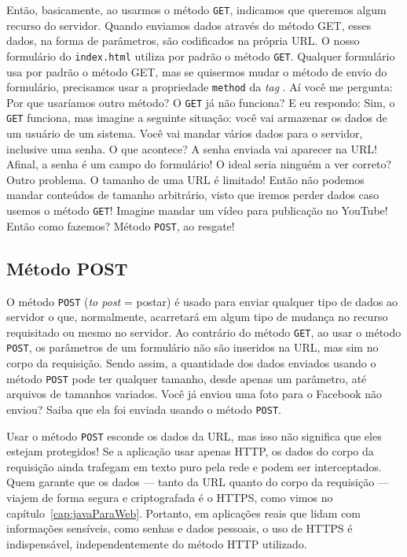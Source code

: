 Então, basicamente, ao usarmos o método \texttt{GET}, indicamos que queremos algum recurso do servidor. Quando enviamos dados através do método GET, esses dados, na forma de parâmetros, são codificados na própria URL. O nosso formulário do \texttt{index.html} utiliza por padrão o método \texttt{GET}. Qualquer formulário usa por padrão o método GET, mas se quisermos mudar o método de envio do formulário, precisamos usar a propriedade \texttt{method} da \textit{tag} . Aí você me pergunta: Por que usaríamos outro método? O \texttt{GET} já não funciona? E eu respondo: Sim, o \texttt{GET} funciona, mas imagine a seguinte situação: você vai armazenar os dados de um usuário de um sistema. Você vai mandar vários dados para o servidor, inclusive uma senha. O que acontece? A senha enviada vai aparecer na URL! Afinal, a senha é um campo do formulário! O ideal seria ninguém a ver correto? Outro problema. O tamanho de uma URL é limitado! Então não podemos mandar conteúdos de tamanho arbitrário, visto que iremos perder dados caso usemos o método \texttt{GET}! Imagine mandar um vídeo para publicação no YouTube! Então como fazemos? Método \texttt{POST}, ao resgate!


\subsection{Método POST}

O método \texttt{POST} (\textit{to post} = postar) é usado para enviar qualquer tipo de dados ao servidor o que, normalmente, acarretará em algum tipo de mudança no recurso requisitado ou mesmo no servidor. Ao contrário do método \texttt{GET}, ao usar o método \texttt{POST}, os parâmetros de um formulário não são inseridos na URL, mas sim no corpo da requisição. Sendo assim, a quantidade dos dados enviados usando o método \texttt{POST} pode ter qualquer tamanho, desde apenas um parâmetro, até arquivos de tamanhos variados. Você já enviou uma foto para o Facebook não enviou? Saiba que ela foi enviada usando o método \texttt{POST}.

\begin{observacao}
    Usar o método \texttt{POST} esconde os dados da URL, mas isso não significa que eles estejam protegidos! Se a aplicação usar apenas HTTP, os dados do corpo da requisição ainda trafegam em texto puro pela rede e podem ser interceptados. Quem garante que os dados --- tanto da URL quanto do corpo da requisição --- viajem de forma segura e criptografada é o HTTPS, como vimos no capítulo~\ref{cap:javaParaWeb}. Portanto, em aplicações reais que lidam com informações sensíveis, como senhas e dados pessoais, o uso de HTTPS é indispensável, independentemente do método HTTP utilizado.
\end{observacao}

